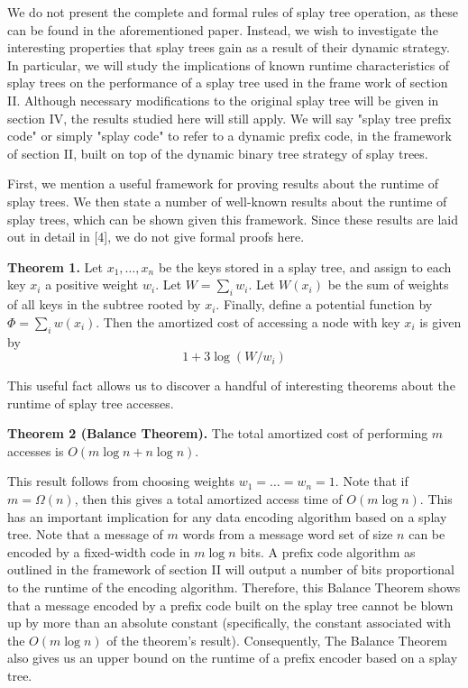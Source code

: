 \documentclass[twoside]{article}
\begin{document}
\begin{multicols}{2}
We do not present the complete and formal rules of splay tree operation, as these can be found in the aforementioned paper. Instead, we wish to investigate the interesting properties that splay trees gain as a result of their dynamic strategy. In particular, we will study the implications of known runtime characteristics of splay trees on the performance of a splay tree used in the frame work of section II. Although necessary modifications to the original splay tree will be given in section IV, the results studied here will still apply. We will say "splay tree prefix code" or simply "splay code" to refer to a dynamic prefix code, in the framework of section II, built on top of the dynamic binary tree strategy of splay trees.

First, we mention a useful framework for proving results about the runtime of splay trees. We then state a number of well-known results about the runtime of splay trees, which can be shown given this framework. Since these results are laid out in detail in [4], we do not give formal proofs here.

\vspace{0.5em}
\noindent \textbf{Theorem 1. } Let $x_1, \dots, x_n$ be the keys stored in a splay tree, and assign to each key $x_i$ a positive weight $w_i$. Let $W = \sum_i w_i$. Let $W(x_i)$ be the sum of weights of all keys in the subtree rooted by $x_i$. Finally, define a potential function by $\Phi = \sum_i w(x_i)$. Then the amortized cost of accessing a node with key $x_i$ is given by
\[
1 + 3\log(W/w_i)
\]

This useful fact allows us to discover a handful of interesting theorems about the runtime of splay tree accesses.

\vspace{0.5em}
\noindent \textbf{Theorem 2 (Balance Theorem).} The total amortized cost of performing $m$ accesses is $O(m \log n + n \log n)$.

\vspace{0.5em}
This result follows from choosing weights $w_1 = \dots = w_n = 1$. Note that if $m = \Omega(n)$, then this gives a total amortized access time of $O(m \log n)$. This has an important implication for any data encoding algorithm based on a splay tree. Note that a message of $m$ words from a message word set of size $n$ can be encoded by a fixed-width code in $m \log n$ bits. A prefix code algorithm as outlined in the framework of section II will output a number of bits proportional to the runtime of the encoding algorithm. Therefore, this Balance Theorem shows that a message encoded by a prefix code built on the splay tree cannot be blown up by more than an absolute constant (specifically, the constant associated with the $O(m\log n)$ of the theorem's result). Consequently, The Balance Theorem also gives us an upper bound on the runtime of a prefix encoder based on a splay tree.


\end{multicols}
\end{document}

